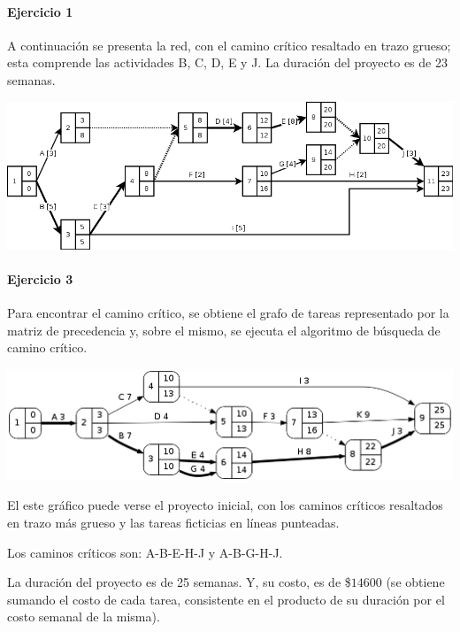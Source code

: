 \documentclass[a4paper,10pt]{article}
\begin{document}
\paragraph{Ejercicio 1} A continuación se presenta la red, con el camino crítico resaltado en trazo grueso; esta comprende las actividades B, C, D, E y J. La duración del proyecto es de 23 semanas.

    \begin{center}
	\includegraphics[scale=0.55,keepaspectratio=true]{img/ej1-red.png} 
	\end{center}
  
  
  
   
   
   
\paragraph{Ejercicio 3}
  Para encontrar el camino crítico, se obtiene el grafo de tareas representado por la matriz de precedencia y, sobre el mismo, se ejecuta el algoritmo de búsqueda de camino crítico.

  \begin{center}
    \includegraphics[scale=0.4,keepaspectratio=true]{img/ej3-0.png} 
  \end{center}

  El este gráfico puede verse el proyecto inicial, con los caminos críticos resaltados en trazo más grueso y las tareas ficticias en líneas punteadas.

  Los caminos críticos son: A-B-E-H-J y A-B-G-H-J.

  La duración del proyecto es de 25 semanas. Y, su costo, es de \$$14600$ (se obtiene sumando el costo de cada tarea, consistente en el producto de su duración por el costo semanal de la misma).
\end{document}

